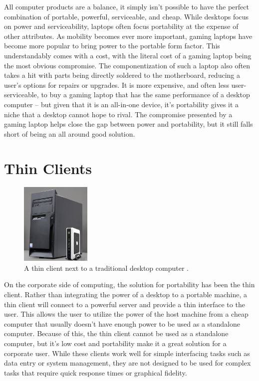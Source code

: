 All computer products are a balance, it simply isn't possible to have the perfect combination of portable, powerful, serviceable, and cheap.
While desktops focus on power and serviceability, laptops often focus portability at the expense of other attributes.
As mobility becomes ever more important, gaming laptops have become more popular to bring power to the portable form factor.
This understandably comes with a cost, with the literal cost of a gaming laptop being the most obvious compromise.
The componentization of such a laptop also often takes a hit with parts being directly soldered to the motherboard, reducing a user's options for repairs or upgrades.
It is more expensive, and often less user-serviceable, to buy a gaming laptop that has the same performance of a desktop computer -- but given that it is an all-in-one device, it's portability gives it a niche that a desktop cannot hope to rival.
The compromise presented by a gaming laptop helps close the gap between power and portability, but it still falls short of being an all around good solution.


\section{Thin Clients}\label{sec:ThinClients}

\begin{figure}
  \centering
  \includegraphics[width=0.3\textwidth]{Figures/ClientronU700}
  \caption[Thin Client]{A thin client next to a traditional desktop computer \cite{ImageThinClient}.}
  \label{fig:ThinClient}
\end{figure}

On the corporate side of computing, the solution for portability has been the thin client.
Rather than integrating the power of a desktop to a portable machine, a thin client will connect to a powerful server and provide a thin interface to the user.
This allows the user to utilize the power of the host machine from a cheap computer that usually doesn't have enough power to be used as a standalone computer.
Because of this, the thin client cannot be used as a standalone computer, but it's low cost and portability make it a great solution for a corporate user.
While these clients work well for simple interfacing tasks such as data entry or system management, they are not designed to be used for complex tasks that require quick response times or graphical fidelity.


